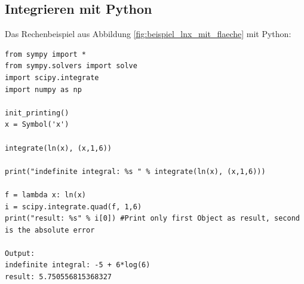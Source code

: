 \documentclass{fhnwreport} %
\begin{document}
\subsection{Integrieren mit Python}
Das Rechenbeispiel aus Abbildung \ref{fig:beispiel_lnx_mit_flaeche} mit Python:
\begin{lstlisting}
from sympy import *
from sympy.solvers import solve
import scipy.integrate 
import numpy as np

init_printing()
x = Symbol('x')

integrate(ln(x), (x,1,6))

print("indefinite integral: %s " % integrate(ln(x), (x,1,6)))

f = lambda x: ln(x)
i = scipy.integrate.quad(f, 1,6)
print("result: %s" % i[0]) #Print only first Object as result, second is the absolute error 

Output: 
indefinite integral: -5 + 6*log(6) 
result: 5.750556815368327
\end{lstlisting}



\clearpage


\end{document}
